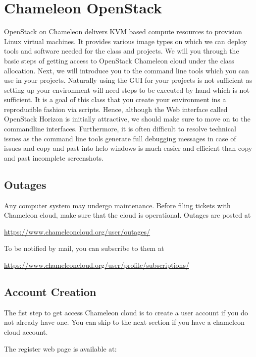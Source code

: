 \section{Chameleon OpenStack}
\label{chameleon-openstack}

OpenStack on Chameleon delivers KVM based compute resources to
provision Linux virtual machines. It provides various image types on
which we can deploy tools and software needed for the class and
projects. We will you through the basic steps of getting access to
OpenStack Chameleon cloud under the class allocation. Next, we will
introduce you to the command line tools which you can use in your
projects. Naturally using the GUI for your projects is not sufficient
as setting up your environment will need steps to be executed by hand
which is not sufficient. It is a goal of this class that you create
your environment ins a reproducible fashion via scripts.  Hence,
although the Web interface called OpenStack Horizon is initially
attractive, we should make sure to move on to the commandline
interfaces.  Furthermore, it is often difficult to resolve technical
issues as the command line tools generate full debugging messages in
case of issues and copy and past into helo windows is much easier and
efficient than copy and past incomplete screenshots.


\subsection{Outages}

Any computer system may undergo maintenance. Before filing tickets
with Chameleon cloud, make sure that the cloud is operational. Outages
are posted at 

\url{https://www.chameleoncloud.org/user/outages/}

To be notified by mail, you can subscribe to them at 

\url{https://www.chameleoncloud.org/user/profile/subscriptions/}

\subsection{Account Creation}

The fist step to get access Chameleon cloud is to create a user
account if you do not already have one. You can skip to the next
section if you have a chameleon cloud account.

The register web page is available at:

